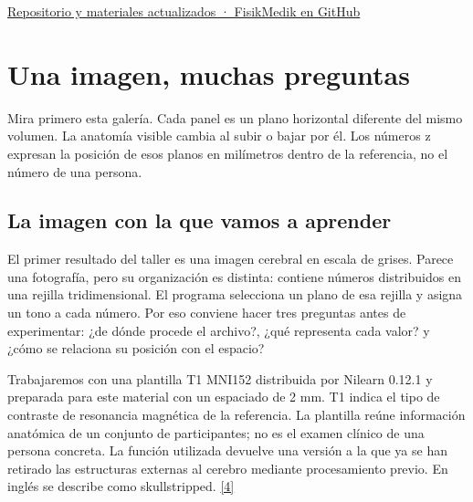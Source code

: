 
\href{https://github.com/FisikMedik/taller-imagenes-medicas-python}{Repositorio y materiales actualizados · FisikMedik en GitHub}

\tableofcontents

\mainmatter

\chapter[La referencia cerebral]{Una imagen, muchas preguntas}

\label{cap:referencia}

Mira primero esta galería. Cada panel es un plano horizontal diferente del mismo volumen. La anatomía visible cambia al subir o bajar por él. Los números z expresan la posición de esos planos en milímetros dentro de la referencia, no el número de una persona.



\section{La imagen con la que vamos a aprender}

El primer resultado del taller es una imagen cerebral en escala de grises. Parece una fotografía, pero su organización es distinta: contiene números distribuidos en una rejilla tridimensional. El programa selecciona un plano de esa rejilla y asigna un tono a cada número. Por eso conviene hacer tres preguntas antes de experimentar: ¿de dónde procede el archivo?, ¿qué representa cada valor? y ¿cómo se relaciona su posición con el espacio?


Trabajaremos con una plantilla T1 MNI152 distribuida por Nilearn 0.12.1 y preparada para este material con un espaciado de 2 mm. T1 indica el tipo de contraste de resonancia magnética de la referencia. La plantilla reúne información anatómica de un conjunto de participantes; no es el examen clínico de una persona concreta. La función utilizada devuelve una versión a la que ya se han retirado las estructuras externas al cerebro mediante procesamiento previo. En inglés se describe como skullstripped. \hyperlink{refR4}{[4]}


